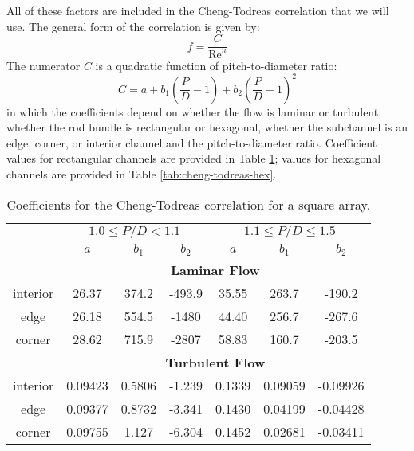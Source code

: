 All of these factors are included in the Cheng-Todreas correlation\cite{cheng1986hydrodynamic} that we will use.  The general form of the correlation is given by:
$$f = \frac{C}{\text{Re}^n}$$
The numerator $C$ is a quadratic function of pitch-to-diameter ratio:
$$C = a + b_1\left(\frac{P}{D}-1\right)+b_2\left(\frac{P}{D}-1\right)^2$$
in which the coefficients depend on whether the flow is laminar or turbulent, whether the rod bundle is rectangular or hexagonal, whether the subchannel is an edge, corner, or interior channel and the pitch-to-diameter ratio.  Coefficient values for rectangular channels are provided in Table \ref{tab:cheng-todreas-sq}; values for hexagonal channels are provided in Table \ref{tab:cheng-todreas-hex}.
\begin{table}
\begin{tabular}{c c c c c c c}
\toprule
  & \multicolumn{3}{c}{$1.0 \le P/D < 1.1$} & \multicolumn{3}{c}{$1.1 \le P/D \le 1.5$} \\
  \cmidrule(lr){2-4} \cmidrule(lr){5-7}
 & $a$ & $b_1$ & $b_2$ & $a$ & $b_1$ & $b_2$ \\
  & \multicolumn{6}{c}{\textbf{Laminar Flow}} \\
interior  & 26.37 & 374.2 & -493.9 & 35.55 & 263.7 & -190.2 \\
edge      & 26.18 & 554.5 & -1480 & 44.40 & 256.7 & -267.6 \\
corner    & 28.62 & 715.9 & -2807 & 58.83 & 160.7 & -203.5 \\
& \multicolumn{6}{c}{\textbf{Turbulent Flow}} \\
interior & 0.09423 & 0.5806 & -1.239 & 0.1339 & 0.09059 & -0.09926 \\
edge     & 0.09377 & 0.8732 & -3.341 & 0.1430 & 0.04199 & -0.04428 \\
corner   & 0.09755 & 1.127 & -6.304 & 0.1452 & 0.02681 & -0.03411 \\
\bottomrule
\end{tabular}
\caption{Coefficients for the Cheng-Todreas correlation for a square array.}
\label{tab:cheng-todreas-sq}
\end{table}
